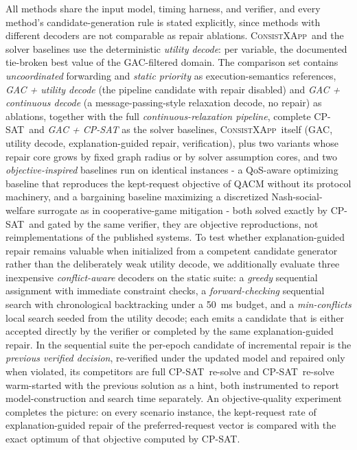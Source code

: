 \documentclass[pdflatex,sn-mathphys-num,iicol,oneside]{sn-jnl}
\newcommand{\method}{\textsc{ConsistXApp}}
\newcommand{\cpsat}{\textsc{CP-SAT}}
\begin{document}
All methods share the input model, timing harness, and verifier, and
every method's candidate-generation rule is stated explicitly, since
methods with different decoders are not comparable as repair
ablations. \method\ and the solver baselines use the deterministic
\emph{utility decode}: per variable, the documented tie-broken best
value of the GAC-filtered domain. The comparison set contains
\emph{uncoordinated} forwarding and \emph{static priority} as
execution-semantics references, \emph{GAC + utility decode} (the
pipeline candidate with repair disabled) and \emph{GAC + continuous
decode} (a message-passing-style relaxation decode, no repair) as
ablations, together with the full \emph{continuous-relaxation
pipeline}, complete \cpsat\ and \emph{GAC + \cpsat} as the solver
baselines, \method\ itself (GAC, utility decode, explanation-guided
repair, verification), plus two variants whose repair core grows by
fixed graph radius or by solver assumption cores, and two
\emph{objective-inspired} baselines run on identical instances - a
QoS-aware optimizing baseline that reproduces the kept-request
objective of QACM \cite{wadud2024qacm} without its protocol
machinery, and a bargaining baseline maximizing a discretized
Nash-social-welfare surrogate as in cooperative-game mitigation
\cite{wadud2023game} - both solved exactly by \cpsat\ and gated by the
same verifier, they are objective reproductions, not reimplementations
of the published systems. To test whether explanation-guided repair
remains valuable when initialized from a competent candidate generator
rather than the deliberately weak utility decode, we additionally
evaluate three inexpensive \emph{conflict-aware} decoders on the static
suite: a \emph{greedy} sequential assignment with immediate constraint
checks, a \emph{forward-checking} sequential search with chronological
backtracking under a 50~ms budget, and a \emph{min-conflicts} local
search seeded from the utility decode; each emits a candidate that is
either accepted directly by the verifier or completed by the same
explanation-guided repair. In the sequential suite the per-epoch
candidate of incremental repair is the \emph{previous verified
decision}, re-verified under the updated model and repaired only when
violated, its competitors are full \cpsat\ re-solve and \cpsat\
re-solve warm-started with the previous solution as a hint, both
instrumented to report model-construction and search time separately.
An objective-quality experiment completes the picture: on every
scenario instance, the kept-request rate of explanation-guided repair
of the preferred-request vector is compared with the exact optimum of
that objective computed by \cpsat.
\end{document}
